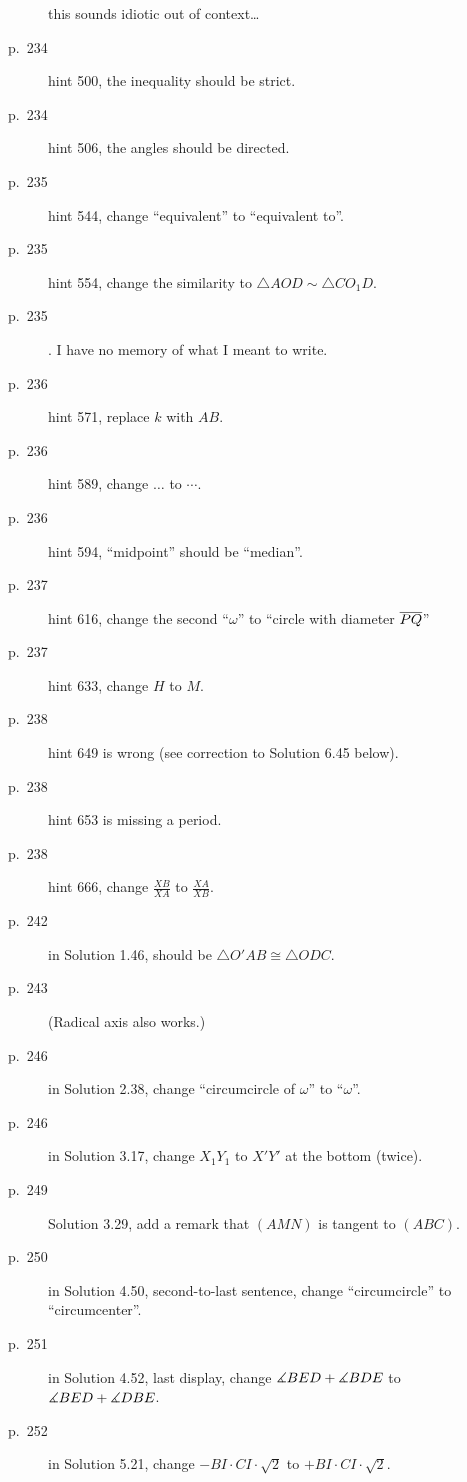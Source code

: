 \documentclass[11pt]{scrartcl}
\begin{document}
\begin{description}
{  this sounds idiotic out of context\dots}
\item[p.\  234] hint 500, the inequality should be strict.
\item[p.\  234] hint 506, the angles should be directed.
\item[p.\  235] hint 544, change ``equivalent'' to ``equivalent to''.
\item[p.\  235] hint 554, change the similarity to $\triangle AOD \sim \triangle CO_1D$.
\item[p.\  235] . I have no memory of what I meant to write.
\item[p.\  236] hint 571, replace $k$ with $AB$.
\item[p.\  236] hint 589, change $\dots$ to $\cdots$.
\item[p.\  236] hint 594, ``midpoint'' should be ``median''.
\item[p.\  237] hint 616, change the second ``$\omega$'' to ``circle with diameter $\overline{PQ}$''
\item[p.\  237] hint 633, change $H$ to $M$.
\item[p.\  238] hint 649 is wrong (see correction to Solution 6.45 below).
\item[p.\  238] hint 653 is missing a period.
\item[p.\  238] hint 666, change $\frac{XB}{XA}$ to $\frac{XA}{XB}$.
\item[p.\  242] in Solution 1.46, should be $\triangle O'AB \cong \triangle ODC$.
\item[p.\  243] 
  (Radical axis also works.)
\item[p.\  246] in Solution 2.38, change ``circumcircle of $\omega$'' to ``$\omega$''.
\item[p.\  246] in Solution 3.17, change $X_1Y_1$ to $X'Y'$ at the bottom (twice).
\item[p.\  249] Solution 3.29, add a remark that $(AMN)$ is tangent to $(ABC)$.
\item[p.\  250] in Solution 4.50, second-to-last sentence,
  change ``circumcircle'' to ``circumcenter''.
\item[p.\  251] in Solution 4.52, last display,
  change $\measuredangle BED + \measuredangle BDE$ to $\measuredangle BED + \measuredangle DBE$.
\item[p.\  252] in Solution 5.21, change $-BI \cdot CI \cdot \sqrt2$ to $+ BI \cdot CI \cdot \sqrt2$.

\end{description}
\end{document}
